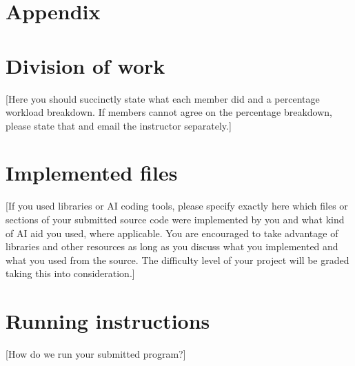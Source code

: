 \documentclass[a4paper,twocolumn]{article}
\begin{document}
\section*{Appendix}
\appendix

\section{Division of work}
[Here you should succinctly state what each member did and a percentage workload breakdown. If members cannot agree on the percentage breakdown, please state that and email the instructor separately.]

\section{Implemented files}
[If you used libraries or AI coding tools, please specify exactly here which files or sections of your submitted source code were implemented by you and what kind of AI aid you used, where applicable. You are encouraged to take advantage of libraries and other resources as long as you discuss what you implemented and what you used from the source. The difficulty level of your project will be graded taking this into consideration.]

\section{Running instructions}
[How do we run your submitted program?]
\end{document}
